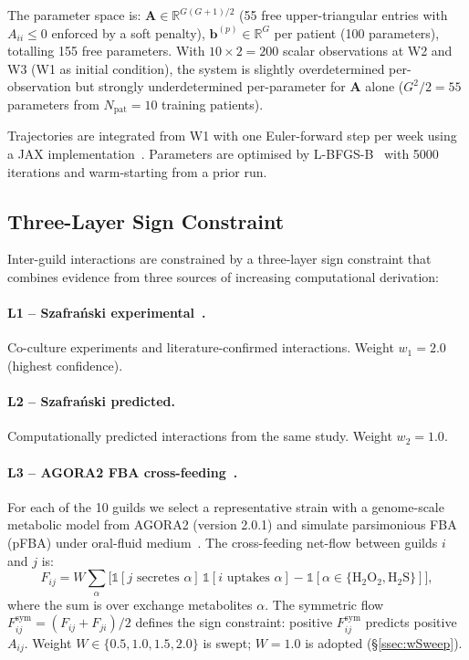\documentclass[11pt,a4paper]{article}
\newcommand{\bA}{\mathbf{A}}
\newcommand{\bb}{\mathbf{b}}
\begin{document}
The parameter space is:
$\bA \in \mathbb{R}^{G(G+1)/2}$ (55 free upper-triangular entries with
$A_{ii}\leq 0$ enforced by a soft penalty),
$\bb^{(p)} \in \mathbb{R}^G$ per patient (100 parameters),
totalling 155 free parameters.
With $10 \times 2 = 200$ scalar observations at W2 and W3 (W1 as initial
condition), the system is slightly overdetermined per-observation but
strongly underdetermined per-parameter for $\bA$ alone ($G^2/2 = 55$
parameters from $N_\text{pat}=10$ training patients).

Trajectories are integrated from W1 with one Euler-forward step per week
using a JAX implementation~\citep{bradbury2018}.
Parameters are optimised by L-BFGS-B~\citep{zhu1997} with 5000 iterations
and warm-starting from a prior run.

\subsection{Three-Layer Sign Constraint}
\label{ssec:prior}

Inter-guild interactions are constrained by a three-layer sign constraint that
combines evidence from three sources of increasing computational derivation:

\paragraph{L1 -- Szafra\'{n}ski experimental~\citep{szafranski2025}.}
Co-culture experiments and literature-confirmed interactions.
Weight $w_1 = 2.0$ (highest confidence).

\paragraph{L2 -- Szafra\'{n}ski predicted.}
Computationally predicted interactions from the same study.
Weight $w_2 = 1.0$.

\paragraph{L3 -- AGORA2 FBA cross-feeding~\citep{heinken2023}.}
For each of the 10 guilds we select a representative strain with a
genome-scale metabolic model from AGORA2 (version 2.0.1) and simulate
parsimonious FBA (pFBA) under oral-fluid medium~\citep{dawes2008}.
The cross-feeding net-flow between guilds $i$ and $j$ is:
\begin{equation}
  F_{ij} = W \sum_{\alpha} \bigl[
    \mathbb{1}[j \text{ secretes } \alpha]\,
    \mathbb{1}[i \text{ uptakes } \alpha]
    - \mathbb{1}[\alpha \in \{\text{H}_2\text{O}_2, \text{H}_2\text{S}\}]\bigr],
\end{equation}
where the sum is over exchange metabolites $\alpha$.
The symmetric flow $F^\text{sym}_{ij} = (F_{ij}+F_{ji})/2$ defines the
sign constraint: positive $F^\text{sym}_{ij}$ predicts positive $A_{ij}$.
Weight $W \in \{0.5, 1.0, 1.5, 2.0\}$ is swept; $W{=}1.0$ is adopted
(§\ref{ssec:wSweep}).
\end{document}
